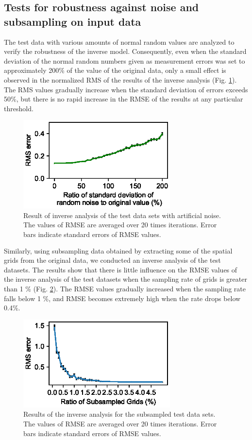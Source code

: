 \subsection{Tests for robustness against noise and subsampling on input data}
The test data with various amounts of normal random values are analyzed to verify the robustness of the inverse model. Consequently, even when the standard deviation of the normal random numbers given as measurement errors was set to approximately 200\% of the value of the original data, only a small effect is observed in the normalized RMS of the results of the inverse analysis (Fig. \ref{fig:test_noise}). The RMS values gradually increase when the standard deviation of errors exceeds 50\%, but there is no rapid increase in the RMSE of the results at any particular threshold.

\begin{figure}[t]
  \includegraphics[width=8cm]{fig10.eps}
  \caption{Result of inverse analysis of the test data sets with artificial noise. The values of RMSE are averaged over 20 times iterations. Error bars indicate standard errors of RMSE values.}
 \label{fig:test_noise}
\end{figure}


Similarly, using subsampling data obtained by extracting some of the spatial grids from the original data, we conducted an inverse analysis of the test datasets. The results show that there is little influence on the RMSE values of the inverse analysis of the test datasets when the sampling rate of grids is greater than 1 \% (Fig. \ref{fig:test_subsampling}). The RMSE values gradually increased when the sampling rate falls below 1 \%, and RMSE becomes extremely high when the rate drops below 0.4\%.

\begin{figure}[t]
  \includegraphics[width=8cm]{fig11.eps}
  \caption{Results of the inverse analysis for the subsampled test data sets. The values of RMSE are averaged over 20 times iterations. Error bars indicate standard errors of RMSE values.}
 \label{fig:test_subsampling}
\end{figure}

